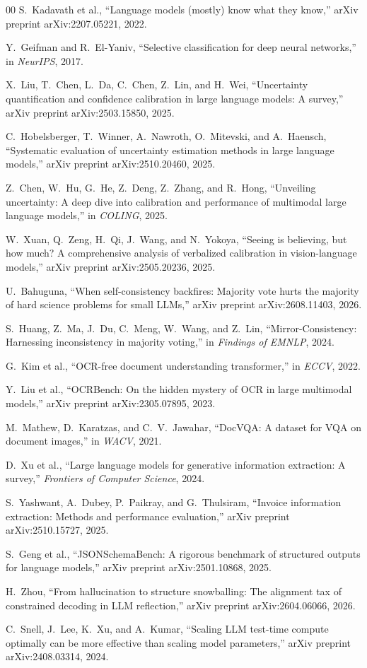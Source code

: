 \documentclass[conference]{IEEEtran}
\begin{document}
\begin{thebibliography}{00}
 S.~Kadavath et al., ``Language models (mostly) know what they know,'' arXiv preprint arXiv:2207.05221, 2022.

 Y.~Geifman and R.~El-Yaniv, ``Selective classification for deep neural networks,'' in \emph{NeurIPS}, 2017.

 X.~Liu, T.~Chen, L.~Da, C.~Chen, Z.~Lin, and H.~Wei, ``Uncertainty quantification and confidence calibration in large language models: A survey,'' arXiv preprint arXiv:2503.15850, 2025.

 C.~Hobelsberger, T.~Winner, A.~Nawroth, O.~Mitevski, and A.~Haensch, ``Systematic evaluation of uncertainty estimation methods in large language models,'' arXiv preprint arXiv:2510.20460, 2025.

 Z.~Chen, W.~Hu, G.~He, Z.~Deng, Z.~Zhang, and R.~Hong, ``Unveiling uncertainty: A deep dive into calibration and performance of multimodal large language models,'' in \emph{COLING}, 2025.

 W.~Xuan, Q.~Zeng, H.~Qi, J.~Wang, and N.~Yokoya, ``Seeing is believing, but how much? A comprehensive analysis of verbalized calibration in vision-language models,'' arXiv preprint arXiv:2505.20236, 2025.

 U.~Bahuguna, ``When self-consistency backfires: Majority vote hurts the majority of hard science problems for small LLMs,'' arXiv preprint arXiv:2608.11403, 2026.

 S.~Huang, Z.~Ma, J.~Du, C.~Meng, W.~Wang, and Z.~Lin, ``Mirror-Consistency: Harnessing inconsistency in majority voting,'' in \emph{Findings of EMNLP}, 2024.

 G.~Kim et al., ``OCR-free document understanding transformer,'' in \emph{ECCV}, 2022.

 Y.~Liu et al., ``OCRBench: On the hidden mystery of OCR in large multimodal models,'' arXiv preprint arXiv:2305.07895, 2023.

 M.~Mathew, D.~Karatzas, and C.~V.~Jawahar, ``DocVQA: A dataset for VQA on document images,'' in \emph{WACV}, 2021.

 D.~Xu et al., ``Large language models for generative information extraction: A survey,'' \emph{Frontiers of Computer Science}, 2024.

 S.~Yashwant, A.~Dubey, P.~Paikray, and G.~Thulsiram, ``Invoice information extraction: Methods and performance evaluation,'' arXiv preprint arXiv:2510.15727, 2025.

 S.~Geng et al., ``JSONSchemaBench: A rigorous benchmark of structured outputs for language models,'' arXiv preprint arXiv:2501.10868, 2025.

 H.~Zhou, ``From hallucination to structure snowballing: The alignment tax of constrained decoding in LLM reflection,'' arXiv preprint arXiv:2604.06066, 2026.

 C.~Snell, J.~Lee, K.~Xu, and A.~Kumar, ``Scaling LLM test-time compute optimally can be more effective than scaling model parameters,'' arXiv preprint arXiv:2408.03314, 2024.

\end{thebibliography}
\end{document}
